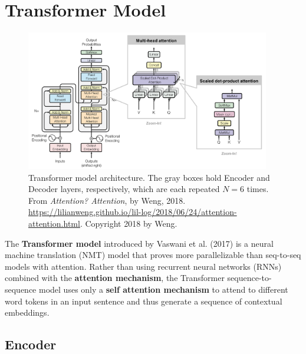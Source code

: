 \section{Transformer Model} \label{Transformer}

\begin{figure}[h]
\vspace{-10pt}
\centering
\includegraphics[width=0.95\textwidth]{imgs/transformer.png}
\vspace{-10pt}
\caption{\footnotesize Transformer model architecture. The gray boxes hold Encoder and Decoder layers, respectively, which are each repeated $N=6$ times. From \emph{Attention? Attention}, by Weng, 2018. \url{https://lilianweng.github.io/lil-log/2018/06/24/attention-attention.html}. Copyright 2018 by Weng.}
\vspace{-5pt}
\end{figure}

The \textbf{Transformer model} introduced by Vaswani et al. (2017) is a neural machine translation (NMT) model that proves more parallelizable than seq-to-seq models with attention. Rather than using recurrent neural networks (RNNs) combined with the \textbf{attention mechanism}, the Transformer sequence-to-sequence model uses only a \textbf{self attention mechanism} to attend to different word tokens in an input sentence and thus generate a sequence of contextual embeddings. 




\subsection{Encoder}

